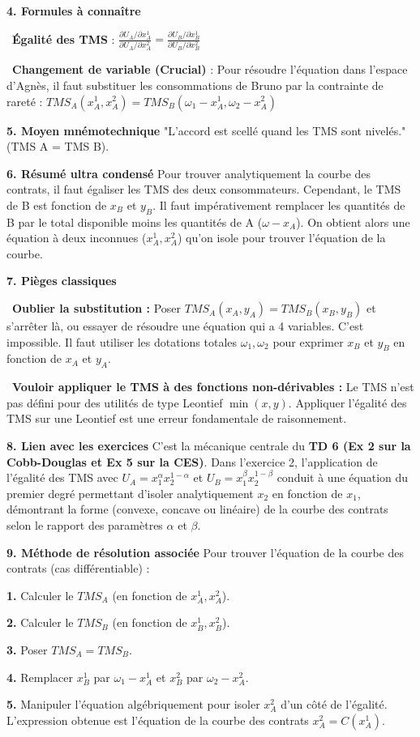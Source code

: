 \documentclass[11pt, a4paper]{report}
\begin{document}
\textbf{4. Formules à connaître}
\par \textbullet\ \textbf{Égalité des TMS} : $\frac{\partial U_A / \partial x_A^1}{\partial U_A / \partial x_A^2} = \frac{\partial U_B / \partial x_B^1}{\partial U_B / \partial x_B^2}$
\par \textbullet\ \textbf{Changement de variable (Crucial)} : Pour résoudre l'équation dans l'espace d'Agnès, il faut substituer les consommations de Bruno par la contrainte de rareté :
    $TMS_A(x_A^1, x_A^2) = TMS_B(\omega_1 - x_A^1, \omega_2 - x_A^2)$

\textbf{5. Moyen mnémotechnique}
"L'accord est scellé quand les TMS sont nivelés." (TMS A = TMS B). 

\textbf{6. Résumé ultra condensé}
Pour trouver analytiquement la courbe des contrats, il faut égaliser les TMS des deux consommateurs. Cependant, le TMS de B est fonction de $x_B$ et $y_B$. Il faut impérativement remplacer les quantités de B par le total disponible moins les quantités de A ($\omega - x_A$). On obtient alors une équation à deux inconnues ($x_A^1, x_A^2$) qu'on isole pour trouver l'équation de la courbe. 

\textbf{7. Pièges classiques}
\par \textbullet\ \textbf{Oublier la substitution :} Poser $TMS_A(x_A, y_A) = TMS_B(x_B, y_B)$ et s'arrêter là, ou essayer de résoudre une équation qui a 4 variables. C'est impossible. Il faut utiliser les dotations totales $\omega_1, \omega_2$ pour exprimer $x_B$ et $y_B$ en fonction de $x_A$ et $y_A$.
\par \textbullet\ \textbf{Vouloir appliquer le TMS à des fonctions non-dérivables :} Le TMS n'est pas défini pour des utilités de type Leontief $\min(x,y)$. Appliquer l'égalité des TMS sur une Leontief est une erreur fondamentale de raisonnement.

\textbf{8. Lien avec les exercices}
C'est la mécanique centrale du \textbf{TD 6 (Ex 2 sur la Cobb-Douglas et Ex 5 sur la CES)}. Dans l'exercice 2, l'application de l'égalité des TMS avec $U_A = x_1^\alpha x_2^{1-\alpha}$ et $U_B = x_1^\beta x_2^{1-\beta}$ conduit à une équation du premier degré permettant d'isoler analytiquement $x_2$ en fonction de $x_1$, démontrant la forme (convexe, concave ou linéaire) de la courbe des contrats selon le rapport des paramètres $\alpha$ et $\beta$.

\textbf{9. Méthode de résolution associée}
Pour trouver l'équation de la courbe des contrats (cas différentiable) :
\par \textbf{1.} Calculer le $TMS_A$ (en fonction de $x_A^1, x_A^2$).
\par \textbf{2.} Calculer le $TMS_B$ (en fonction de $x_B^1, x_B^2$).
\par \textbf{3.} Poser $TMS_A = TMS_B$.
\par \textbf{4.} Remplacer $x_B^1$ par $\omega_1 - x_A^1$ et $x_B^2$ par $\omega_2 - x_A^2$.
\par \textbf{5.} Manipuler l'équation algébriquement pour isoler $x_A^2$ d'un côté de l'égalité. L'expression obtenue est l'équation de la courbe des contrats $x_A^2 = C(x_A^1)$.
\end{document}
